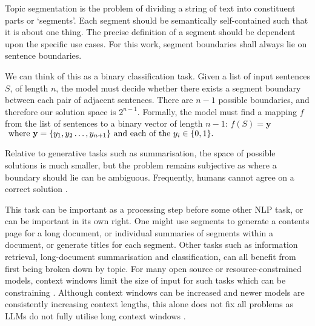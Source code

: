 
Topic segmentation is the problem of dividing a string of text into constituent parts or ‘segments’. Each segment should be semantically self-contained such that it is about one thing. The precise definition of a segment should be dependent upon the specific use cases. For this work, segment boundaries shall always lie on sentence boundaries.

We can think of this as a binary classification task.  Given a list of input sentences $S$, of length $n$, the model must decide whether there exists a segment boundary between each pair of adjacent sentences. There are $n-1$ possible boundaries, and therefore our solution space is $2^{n-1}$.  Formally, the model must find a mapping $f$ from the list of sentences to a binary vector of length $n-1$:
\(
     f(S) = \textbf{y} 
\)
\( \textnormal{ where } \textbf{y}=\{y_1,y_2\ldots,y_{n+1}\} \textnormal{ and each of the } y_i\in\{0,1\}.
\)

Relative to generative tasks such as summarisation, the space of possible solutions is much smaller, but the problem remains subjective as where a boundary should lie can be ambiguous. Frequently, humans cannot agree on a correct solution \cite{TextTiling}.

This task can be important as a processing step before some other NLP task, or can be important in its own right. One might use segments to generate a contents page for a long document, or individual summaries of segments within a document, or generate titles for each segment. Other tasks such as information retrieval, long-document summarisation and classification, can all benefit from first being broken down by topic. For many open source or resource-constrained models, context windows limit the size of input for such tasks which can be constraining \cite{FlanT5}. Although context windows can be increased \cite{ExtendingContextWindows} and newer models are consistently increasing context lengths, this alone does not fix all problems as LLMs do not fully utilise long context windows \cite{EffectOfLongContextWindows} \cite{ContextAffectsFactual}. 

 
